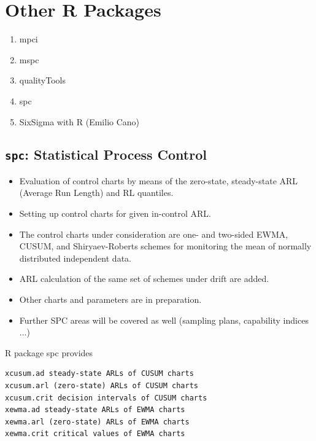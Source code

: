 \documentclass[]{article}
\begin{document}
\section{Other R Packages}

\begin{enumerate}
\item mpci
\item mspc
\item qualityTools
\item spc
\item SixSigma with R (Emilio Cano)
\end{enumerate}

\tableofcontents

\newpage


\newpage
\subsection{ \texttt{spc}: Statistical Process Control }


\begin{itemize}
\item Evaluation of control charts by means of the zero-state, steady-state ARL (Average Run Length) and RL quantiles. 

\item Setting up control charts for given in-control ARL. 

\item The control charts under consideration are one- and two-sided EWMA, CUSUM, and Shiryaev-Roberts schemes for monitoring the mean of normally distributed independent data. 

\item
ARL calculation of the same set of schemes under drift are added. 

\item Other charts and parameters are in preparation. 

\item Further SPC areas will be covered as well (sampling plans, capability indices ...)
\end{itemize}


R package spc provides

\begin{verbatim}
xcusum.ad steady-state ARLs of CUSUM charts
xcusum.arl (zero-state) ARLs of CUSUM charts
xcusum.crit decision intervals of CUSUM charts
xewma.ad steady-state ARLs of EWMA charts
xewma.arl (zero-state) ARLs of EWMA charts
xewma.crit critical values of EWMA charts
\end{verbatim}
\end{document}
